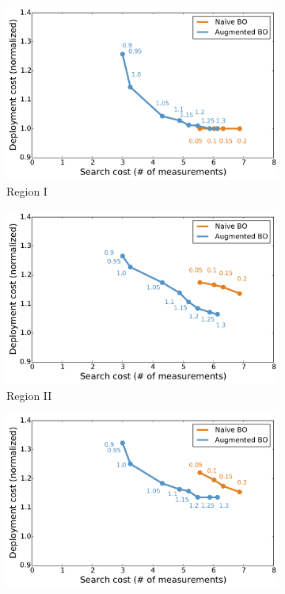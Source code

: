 \begin{figure}[!htbp]
\centering
\begin{subfigure}[b]{0.5\textwidth}
    \includegraphics[width=\linewidth]{figures/stopping_criteria_comparison_cost_good.pdf}
    \caption{Region I}
    \label{fig:stopping_criteria_comparison_good}
\end{subfigure}
\begin{subfigure}[b]{0.5\textwidth}
    \includegraphics[width=\linewidth]{figures/stopping_criteria_comparison_cost_bad.pdf}
    \caption{Region II}
    \label{fig:stopping_criteria_comparison_bad}
\end{subfigure}
\begin{subfigure}[b]{0.5\textwidth}
    \includegraphics[width=\linewidth]{figures/stopping_criteria_comparison_cost_problematic.pdf}

\end{subfigure}
\end{figure}

